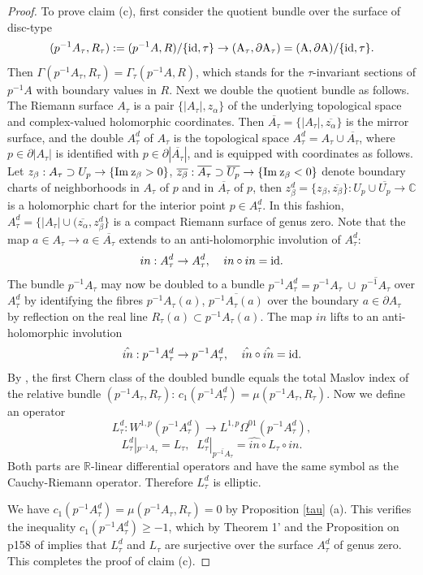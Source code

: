 \documentclass{amsart}
\begin{document}
\begin{proof}
To prove claim (c), first consider the quotient bundle over the surface of disc-type
\[
(p^{-1}A_\tau, R_\tau) :=(p^{-1}A,R)/\{\rm{id},\tau \}\rightarrow (A_\tau, \partial A_\tau)=(A, \partial A)/\{\rm{id},\tau \}.
\]
Then $\Gamma(p^{-1}A_\tau, R_\tau)=\Gamma_\tau(p^{-1}A,R)$, which stands for the $\tau$-invariant sections of $p^{-1}A$ with boundary values in $R$. Next we double the quotient bundle as follows. The Riemann surface $ A_\tau$ is a pair $\{|A_\tau|, z_\alpha  \}$ of the underlying topological space and complex-valued holomorphic coordinates. Then $\overline{A_\tau}=\{|A_\tau|, \overline{z_\alpha}  \}$ is the mirror surface, and the double $A_\tau^d$ of $A_\tau$ is the topological space $  A_\tau^d= A_\tau  \cup   \overline{A_\tau}$, where $p \in \partial |A_\tau|$ is identified with $p \in \partial |\overline{A_\tau}|$, and is equipped with coordinates as follows. Let $z_\beta:A_\tau \supset U_p \to \{ \rm{Im}\: z_\beta > 0  \}$, $ \overline {z_\beta}: \overline {A_\tau} \supset \overline {U_p} \to \{ \rm{Im}\: z_\beta <  0  \}$ denote boundary charts of neighborhoods in $A_\tau$ of $p$ and in $\overline{A_\tau}$ of $p$, then  $z_\beta^d=\{ z_\beta, \overline {z_\beta} \}:U_p \cup \overline {U_p}\to{\mathbb{C}}$ is a holomorphic chart for the interior point $p \in A_\tau^d$.
In this fashion, $ A_\tau^d=\{|A_\tau| \cup (\overline{z_\alpha},z_\beta^d \}$ is a compact Riemann surface of genus zero. Note that the map $a\in A_\tau\to a \in \overline {A_\tau}$ extends to an anti-holomorphic involution of $ A_\tau^d$:
\[    
in:A_\tau^d \to A_\tau^d  ,\;\;\;\; in \circ  in =\rm{id}.
\]
The bundle $p^{-1}A_\tau$ may now be doubled to a bundle $p^{-1}A_\tau^d=p^{-1}A_\tau \; \cup \; \overline{p^{-1}A_\tau}$ over  $A_\tau^d$ by identifying the fibres $p^{-1}A_\tau(a)$, $ \overline{p^{-1}A_\tau(a)}$ over the boundary $a \in \partial A_\tau$ by reflection on the real line $R_\tau(a) \subset p^{-1}A_\tau(a)$.
The map $in$ lifts to an anti-holomorphic involution
\[   
\hat{ in}:p^{-1}A_\tau^d \to  p^{-1}A_\tau^d,
\;\;\;\; \hat{ in} \circ  \hat{ in} =\rm{id}.
\]
By \cite{MS12}, the first Chern class of the doubled bundle equals the total Maslov index of the relative bundle $(p^{-1}A_\tau , R_\tau)$: $c_1(p^{-1}A_\tau^d)=\mu(p^{-1}A_\tau , R_\tau)$. Now we define an operator 
\[ 
L^d_\tau:W^{1,p}(p^{-1}A_\tau^d)\to L^{1,p}\Omega^{01}(p^{-1}A_\tau^d),
\]
\[L^d_\tau|_{p^{-1}A_\tau}=L_\tau , \;\;
L^d_\tau|_{\overline{p^{-1}A_\tau}} = \hat{in} \circ L_\tau \circ in.
\]
Both parts are ${\mathbb{R}}$-linear differential operators and have the same symbol as the Cauchy-Riemann operator. Therefore $L^d_\tau$ is elliptic. 

We have $c_1(p^{-1}A_\tau^d)=\mu(p^{-1}A_\tau , R_\tau)=0$ by Proposition \ref{tau} (a). This verifies the inequality $c_1(p^{-1}A_\tau^d) \ge -1 $, which by  Theorem 1' and the Proposition on p158 of \cite{HLS} implies that  $L^d_\tau$ and $L_\tau$ are surjective over the surface $A^d_\tau$ of genus zero. This completes the proof of claim (c).
\end{proof} 
\end{document}
